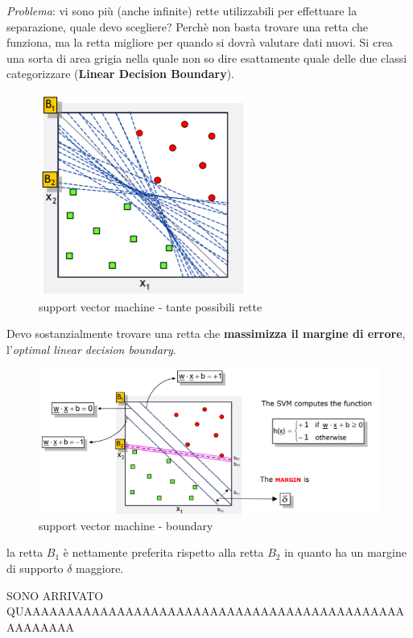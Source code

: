 \textit{Problema}: vi sono pi\`u (anche infinite) rette utilizzabili per effettuare la separazione, quale devo scegliere? Perch\`e non basta trovare una retta che funziona, ma la retta migliore per quando si dovr\`a valutare dati nuovi. Si crea una sorta di area grigia nella quale non so dire esattamente quale delle due classi categorizzare (\textbf{Linear Decision Boundary}).

\begin{figure}[H]
	\centering
	\includegraphics[height=0.4 \linewidth]{classification/pict/svm_rette.png}
	\caption{support vector machine - tante possibili rette}
\end{figure}

Devo sostanzialmente trovare una retta che \textbf{massimizza il margine di errore}, l'\textit{optimal linear decision boundary}. 

\begin{figure}[H]
	\hspace{-0.5cm}
	\includegraphics[height=0.45 \linewidth]{classification/pict/svm_boundary.png}
	\caption{support vector machine - boundary}
\end{figure}

la retta $B_1$ è nettamente preferita rispetto alla retta $B_2$ in quanto ha un margine di supporto $\delta$ maggiore.

SONO ARRIVATO QUAAAAAAAAAAAAAAAAAAAAAAAAAAAAAAAAAAAAAAAAAAAAAAAAAAAAA

